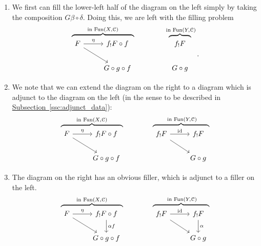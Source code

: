 \documentclass[main.tex]{subfiles}
\begin{document}
\begin{enumerate}
  \item We first can fill the lower-left half of the diagram on the left simply by taking the composition $G\beta \circ \delta$. Doing this, we are left with the filling problem
    \begin{equation*}
      \overbrace{
      \begin{tikzcd}[ampersand replacement=\&]
        F
        \arrow[r, "\eta"]
        \arrow[dr]
        \& f_{!}F \circ f
        \\
        \& G \circ g \circ f
      \end{tikzcd}}^{\text{in }\Fun(X, \category{C})}
      \qquad\qquad
      \overbrace{
      \begin{tikzcd}
        f_{!}F
        \\
        G \circ g
      \end{tikzcd}}^{\text{ in }\Fun(Y, \category{C})}.
    \end{equation*}

  \item We note that we can extend the diagram on the right to a diagram which is adjunct to the diagram on the left (in the sense to be described in \hyperref[ssc:adjunct_data]{Subsection~\ref*{ssc:adjunct_data}}):
    \begin{equation*}
      \overbrace{
      \begin{tikzcd}[ampersand replacement=\&]
        F
        \arrow[r, "\eta"]
        \arrow[dr]
        \& f_{!}F \circ f
        \\
        \& G \circ g \circ f
      \end{tikzcd}}^{\text{in }\Fun(X, \category{C})}
      \qquad\qquad
      \overbrace{
        \begin{tikzcd}[ampersand replacement=\&]
          f_{!}F
          \arrow[r, "\id"]
          \arrow[dr]
        \& f_{!}F
        \\
        \& G \circ g
      \end{tikzcd}}^{\text{ in }\Fun(Y, \category{C})}
    \end{equation*}

  \item The diagram on the right has an obvious filler, which is adjunct to a filler on the left.
    \begin{equation*}
      \overbrace{
      \begin{tikzcd}[ampersand replacement=\&]
        F
        \arrow[r, "\eta"]
        \arrow[dr]
        \& f_{!}F \circ f
        \arrow[d, "\alpha f"]
        \\
        \& G \circ g \circ f
      \end{tikzcd}}^{\text{in }\Fun(X, \category{C})}
      \qquad\qquad
      \overbrace{
        \begin{tikzcd}[ampersand replacement=\&]
          f_{!}F
          \arrow[r, "\id"]
          \arrow[dr]
        \& f_{!}F
        \arrow[d, "\alpha"]
        \\
        \& G \circ g
      \end{tikzcd}}^{\text{ in }\Fun(Y, \category{C})}
    \end{equation*}
\end{enumerate}
\end{document}
